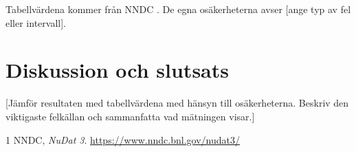 \documentclass[a4paper,11pt]{article}
\begin{document}
Tabellvärdena kommer från NNDC \cite{nndc}.
De egna osäkerheterna avser [ange typ av fel eller intervall].

\section*{Diskussion och slutsats}
[Jämför resultaten med tabellvärdena med hänsyn till
osäkerheterna. Beskriv den viktigaste felkällan och
sammanfatta vad mätningen visar.]

\begin{thebibliography}{1}
NNDC, \textit{NuDat 3}.
\url{https://www.nndc.bnl.gov/nudat3/}
\end{thebibliography}
\end{document}
